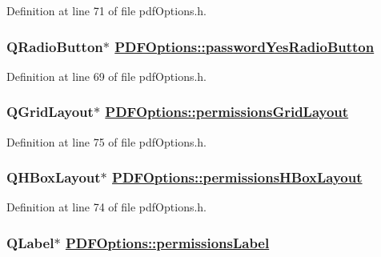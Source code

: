 Definition at line 71 of file pdf\-Options.h.\hypertarget{classPDFOptions_r30}{
\subsubsection[passwordYesRadioButton]{\setlength{\rightskip}{0pt plus 5cm}QRadio\-Button$\ast$ \hyperlink{classPDFOptions_r30}{PDFOptions::password\-Yes\-Radio\-Button}}}
\label{classPDFOptions_r30}


Definition at line 69 of file pdf\-Options.h.\hypertarget{classPDFOptions_r35}{
\subsubsection[permissionsGridLayout]{\setlength{\rightskip}{0pt plus 5cm}QGrid\-Layout$\ast$ \hyperlink{classPDFOptions_r35}{PDFOptions::permissions\-Grid\-Layout}}}
\label{classPDFOptions_r35}


Definition at line 75 of file pdf\-Options.h.\hypertarget{classPDFOptions_r34}{
\subsubsection[permissionsHBoxLayout]{\setlength{\rightskip}{0pt plus 5cm}QHBox\-Layout$\ast$ \hyperlink{classPDFOptions_r34}{PDFOptions::permissions\-HBox\-Layout}}}
\label{classPDFOptions_r34}


Definition at line 74 of file pdf\-Options.h.\hypertarget{classPDFOptions_r33}{
\subsubsection[permissionsLabel]{\setlength{\rightskip}{0pt plus 5cm}QLabel$\ast$ \hyperlink{classPDFOptions_r33}{PDFOptions::permissions\-Label}}}
\label{classPDFOptions_r33}


